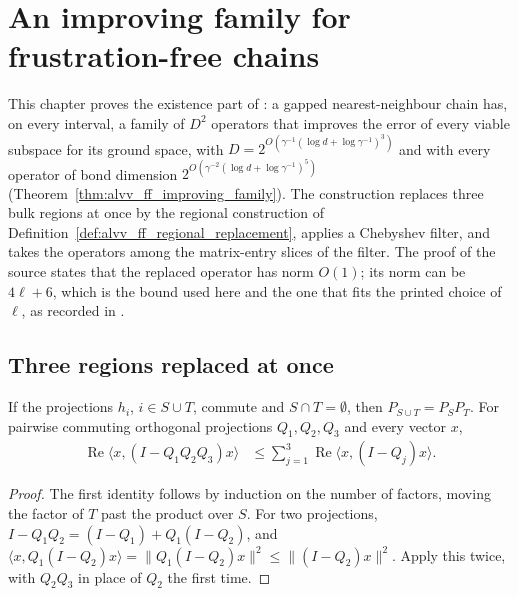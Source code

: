 \chapter{An improving family for frustration-free chains}
\label{ch:alvv_ff_improving_family}

This chapter proves the existence part of
\cite[Theorem~5.15]{Arad2016RigorousRG}: a gapped nearest-neighbour chain has,
on every interval, a family of $D^2$ operators that improves the error of every
viable subspace for its ground space, with
$D=2^{O(\gamma^{-1}(\log d+\log\gamma^{-1})^3)}$ and with every operator of
bond dimension $2^{O(\gamma^{-2}(\log d+\log\gamma^{-1})^5)}$
(Theorem~\ref{thm:alvv_ff_improving_family}). The construction replaces three
bulk regions at once by the regional construction of
Definition~\ref{def:alvv_ff_regional_replacement}, applies a Chebyshev filter, and
takes the operators among the matrix-entry slices of the filter. The proof of the
source states that the replaced operator has norm $O(1)$; its norm can be
$4\ell+6$, which is the bound used here and the one that fits the printed choice
of $\ell$, as recorded in \cite{gap:alvv16_ff_truncated_norm}.

\section{Three regions replaced at once}

\begin{lemma}
    \label{lem:alvv_ff_family_union_bound}
    \leanok
    If the projections $h_i$, $i\in S\cup T$, commute and $S\cap T=\emptyset$,
    then $P_{S\cup T}=P_SP_T$. For pairwise commuting orthogonal projections
    $Q_1,Q_2,Q_3$ and every vector $x$,
    \begin{align}
        \operatorname{Re}\langle x,(I-Q_1Q_2Q_3)x\rangle
         & \le\sum_{j=1}^3\operatorname{Re}\langle x,(I-Q_j)x\rangle.
        \label{eq:alvv_ff_family_union_bound}
    \end{align}
\end{lemma}
\begin{proof}\leanok
    The first identity follows by induction on the number of factors, moving the
    factor of $T$ past the product over $S$. For two projections,
    $I-Q_1Q_2=(I-Q_1)+Q_1(I-Q_2)$, and
    $\langle x,Q_1(I-Q_2)x\rangle=\|Q_1(I-Q_2)x\|^2\le\|(I-Q_2)x\|^2$.
    Apply this twice, with $Q_2Q_3$ in place of $Q_2$ the first time.
\end{proof}

